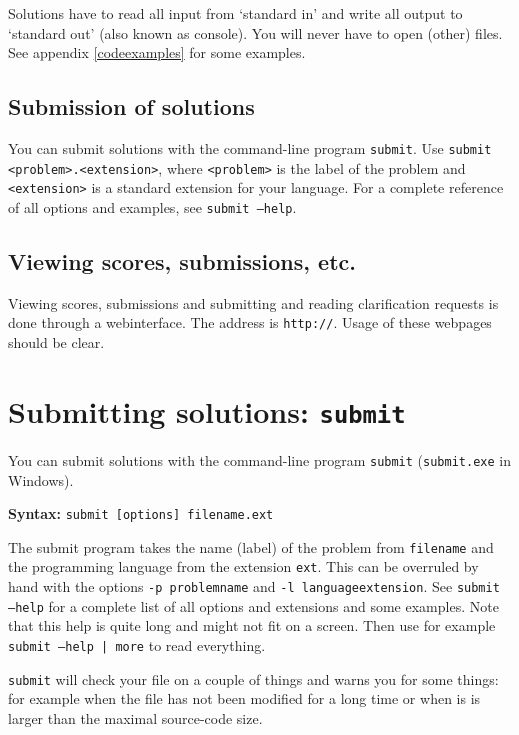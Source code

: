 \documentclass[11pt,a4paper]{article}
\newcommand{\url}[1]{\texttt{#1}}
\begin{document}
Solutions have to read all input from `standard in' and write all
output to `standard out' (also known as console). You will never have
to open (other) files. See appendix \ref{codeexamples} for some
examples.

\subsection{Submission of solutions}

You can submit solutions with the command-line program
\texttt{submit}. Use \texttt{submit <problem>.<extension>}, where
\texttt{<problem>} is the label of the problem and
\texttt{<extension>} is a standard extension for your language.
For a complete reference of all options and examples, see
\texttt{submit --help}.

\subsection{Viewing scores, submissions, etc.}

Viewing scores, submissions and submitting and reading clarification
requests is done through a webinterface. The address is
\url{http://\WEBSERVER}. Usage of these webpages should be clear.

\newpage
\section{Submitting solutions: \texttt{submit}}\label{submit}

You can submit solutions with the command-line program
\texttt{submit} (\texttt{submit.exe} in Windows).

\textbf{Syntax:} \texttt{submit [options] filename.ext}

The submit program takes the name (label) of the problem from
\texttt{filename} and the programming language from the extension
\texttt{ext}. This can be overruled by hand with the options
\texttt{-p problemname} and \texttt{-l languageextension}.
See \texttt{submit --help} for a complete list of all options and
extensions and some examples. Note that this help is quite long and
might not fit on a screen. Then use for example
\texttt{submit --help | more} to read everything.

\texttt{submit} will check your file on a couple of things and warns
you for some things: for example when the file has not been modified
for a long time or when is is larger than the maximal source-code size.
\end{document}
